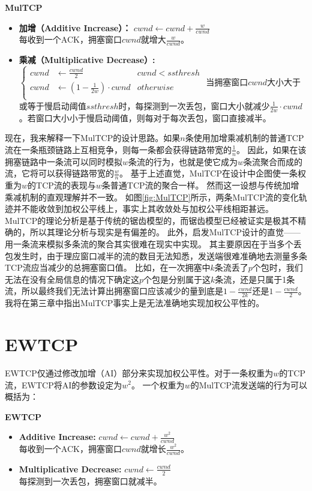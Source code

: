 \documentclass[winfonts]{njuthesis}
\begin{document}
\textbf{\large MulTCP}
\begin{itemize}
  \item {\bf 加增（Additive Increase）：} $cwnd \leftarrow cwnd + \frac{w}{cwnd}$ \\
  每收到一个ACK，拥塞窗口$cwnd$就增大$\frac{w}{cwnd}$。
  \item {\bf 乘减（Multiplicative Decrease）:}
  $ \left\{
  \begin{aligned}
  cwnd & \leftarrow \frac{cwnd}{2} & cwnd < ssthresh \\
  cwnd & \leftarrow \left( 1 - \frac{1}{2w} \right) \cdot cwnd & otherwise\\
  \end{aligned}
  \right.$ 
  当拥塞窗口$cwnd$大小大于或等于慢启动阈值$ssthresh$时，每探测到一次丢包，窗口大小就减少$\frac{1}{2w} \cdot cwnd$。若窗口大小小于慢启动阈值，则每对于每次丢包，窗口直接减半。
\end{itemize}
现在，我来解释一下MulTCP的设计思路。如果$n$条使用加增乘减机制的普通TCP流在一条瓶颈链路上互相竞争，则每一条都会获得链路带宽的$\frac{1}{n}$。
因此，如果在该拥塞链路中一条流可以同时模拟$w$条流的行为，也就是使它成为$w$条流聚合而成的流，它将可以获得链路带宽的$\frac{w}{n}$。
基于上述直觉，MulTCP在设计中企图使一条权重为$w$的TCP流的表现与$w$条普通TCP流的聚合一样。
然而这一设想与传统加增乘减机制的直观理解\cite{chiu1989analysis}并不一致。
如图\ref{fig:MulTCP}所示，两条MulTCP流的变化轨迹并不能收敛到加权公平线上，事实上其收敛处与加权公平线相距甚远。
MulTCP的理论分析是基于传统的锯齿模型的，而锯齿模型已经被证实是极其不精确的\cite{alizadeh2011analysis}，所以其理论分析与现实是有偏差的。
此外，启发MulTCP设计的直觉——用一条流来模拟多条流的聚合其实很难在现实中实现。
其主要原因在于当多个丢包发生时，由于理应窗口减半的流的数目无法知悉，发送端很难准确地去测量多条TCP流应当减少的总拥塞窗口值。
比如，在一次拥塞中$k$条流丢了$p$个包时，我们无法在没有全局信息的情况下确定这$p$个包是分别属于这$k$条流，还是只属于1条流，所以最终我们无法计算出拥塞窗口应该减少的量到底是$1 - \frac{cwnd}{2k}$还是$1 - \frac{cwnd}{2}$。
我将在第三章中指出MulTCP事实上是无法准确地实现加权公平性的。

\section{EWTCP}

EWTCP仅通过修改加增（AI）部分来实现加权公平性。对于一条权重为$w$的TCP流，EWTCP将AI的参数设定为$w^2$。
一个权重为$w$的MulTCP流发送端的行为可以概括为：

\textbf{\large EWTCP}
\begin{itemize}
  \item {\bf Additive Increase:} $cwnd \leftarrow cwnd + \frac{w^2}{cwnd}$ \\
  每收到一个ACK，拥塞窗口$cwnd$就增长$\frac{w^2}{cwnd}$。
  \item {\bf Multiplicative Decrease:} $cwnd \leftarrow \frac{cwnd}{2}$ \\
  每探测到一次丢包，拥塞窗口就减半。
\end{itemize}
\end{document}
